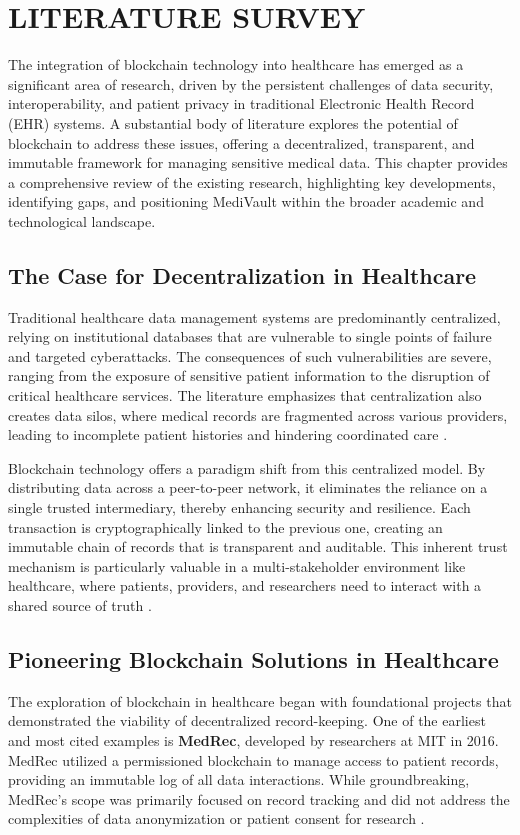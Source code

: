\chapter{LITERATURE SURVEY}
\label{chap:literature_survey}

The integration of blockchain technology into healthcare has emerged as a significant area of research, driven by the persistent challenges of data security, interoperability, and patient privacy in traditional Electronic Health Record (EHR) systems. A substantial body of literature explores the potential of blockchain to address these issues, offering a decentralized, transparent, and immutable framework for managing sensitive medical data. This chapter provides a comprehensive review of the existing research, highlighting key developments, identifying gaps, and positioning MediVault within the broader academic and technological landscape.

\section{The Case for Decentralization in Healthcare}
Traditional healthcare data management systems are predominantly centralized, relying on institutional databases that are vulnerable to single points of failure and targeted cyberattacks. The consequences of such vulnerabilities are severe, ranging from the exposure of sensitive patient information to the disruption of critical healthcare services. The literature emphasizes that centralization also creates data silos, where medical records are fragmented across various providers, leading to incomplete patient histories and hindering coordinated care \autocite{abdel2023blockchain}.

Blockchain technology offers a paradigm shift from this centralized model. By distributing data across a peer-to-peer network, it eliminates the reliance on a single trusted intermediary, thereby enhancing security and resilience. Each transaction is cryptographically linked to the previous one, creating an immutable chain of records that is transparent and auditable. This inherent trust mechanism is particularly valuable in a multi-stakeholder environment like healthcare, where patients, providers, and researchers need to interact with a shared source of truth \autocite{damar2025blockchain}.

\section{Pioneering Blockchain Solutions in Healthcare}
The exploration of blockchain in healthcare began with foundational projects that demonstrated the viability of decentralized record-keeping. One of the earliest and most cited examples is \textbf{MedRec}, developed by researchers at MIT in 2016. MedRec utilized a permissioned blockchain to manage access to patient records, providing an immutable log of all data interactions. While groundbreaking, MedRec's scope was primarily focused on record tracking and did not address the complexities of data anonymization or patient consent for research \autocite{ekblaw2016case}.

